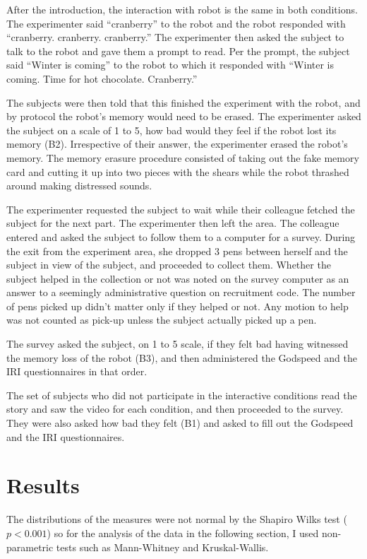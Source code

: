 After the introduction, the interaction with robot is the same in both conditions. The experimenter said ``cranberry'' to the robot and the robot responded with ``cranberry. cranberry. cranberry.'' The experimenter then asked the subject to talk to the robot and gave them a prompt to read. Per the prompt, the subject said ``Winter is coming'' to the robot to which it responded with ``Winter is coming. Time for hot chocolate. Cranberry.''

The subjects were then told that this finished the experiment with the robot, and by protocol the robot's memory would need to be erased. The experimenter asked the subject on a scale of 1 to 5, how bad would they feel if the robot lost its memory (B2). Irrespective of their answer, the experimenter erased the robot's memory. The memory erasure procedure consisted of taking out the fake memory card and cutting it up into two pieces with the shears while the robot thrashed around making distressed sounds. 

The experimenter requested the subject to wait while their colleague fetched the subject for the next part. The experimenter then left the area. The colleague entered and asked the subject to follow them to a computer for a survey. During the exit from the experiment area, she dropped 3 pens between herself and the subject in view of the subject, and proceeded to collect them. Whether the subject helped in the collection or not was noted on the survey computer as an answer to a seemingly administrative question on recruitment code. The number of pens picked up didn't matter only if they helped or not. Any motion to help was not counted as pick-up unless the subject actually picked up a pen. 

The survey asked the subject, on 1 to 5 scale, if they felt bad having witnessed the memory loss of the robot (B3), and then administered the Godspeed and the IRI questionnaires in that order. 

The set of subjects who did not participate in the interactive conditions read the story and saw the video for each condition, and then proceeded to the survey. They were also asked how bad they felt (B1) and asked to fill out the Godspeed and the IRI questionnaires. 


\section{Results}

The distributions of the measures were not normal by the Shapiro Wilks test ($p < 0.001$) so for the analysis of the data in the following section, I used non-parametric tests such as Mann-Whitney and Kruskal-Wallis.

